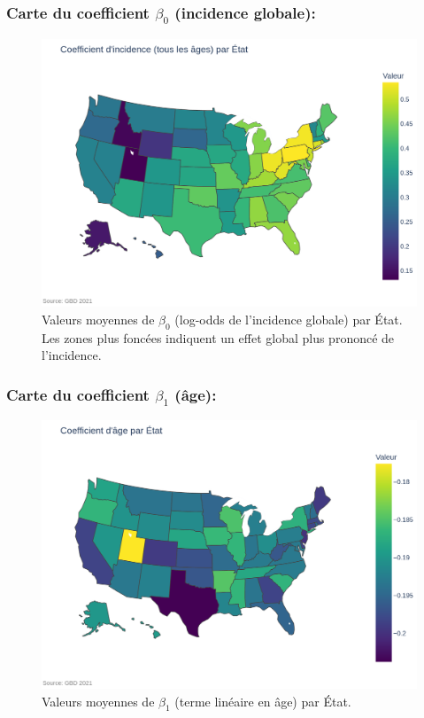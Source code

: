 \subsubsection{Carte du coefficient \(\beta_0\) (incidence globale):}

\begin{figure}[H]
	\centering
	\includegraphics[width=1\textwidth]{images/map_incidence_all.png}
	\caption{Valeurs moyennes de \(\beta_0\) (log-odds de l'incidence globale) par État. 
		Les zones plus foncées indiquent un effet global plus prononcé de l'incidence.}
\end{figure}

\subsubsection{Carte du coefficient \(\beta_1\) (âge):}

\begin{figure}[H]
	\centering
	\includegraphics[width=1\textwidth]{images/map_age.png}
	\caption{Valeurs moyennes de \(\beta_1\) (terme linéaire en âge) par État.}
\end{figure}

